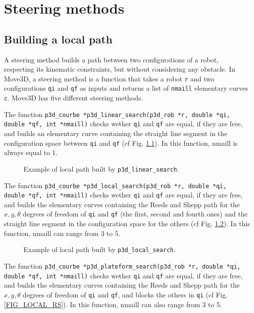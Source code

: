 \chapter{Steering methods}

\section{Building a local path}

A steering method builds a path between two configurations of a robot,
respecting its kinematic constraints, but without considering any
obstacle. In Move3D, a steering method is a function that takes a
robot {\tt r} and two configurations {\tt qi} and {\tt qf} as inputs
and returns a list of {\tt nmaill} elementary curves {\tt c}. Move3D
has five different steering methods. 

The function {\tt p3d\_courbe *p3d\_linear\_search(p3d\_rob *r, double
*qi, double *qf, int *nmaill)}  checks
wether {\tt qi} and {\tt qf} are equal, if they are free, and builds
an elementary curve containing the straight line segment in the
configuration space between {\tt qi} and {\tt qf} (cf
Fig. \ref{FIG_LOCAL_SEG}). In this function, nmaill is always equal to
1.

\begin{figure}[hbt]
\centerline{
}
\caption{\small 
Example of local path built by {\tt p3d\_linear\_search}.
}
\label{FIG_LOCAL_SEG}
\end{figure}  

The function {\tt p3d\_courbe *p3d\_local\_search(p3d\_rob *r, double
*qi, double *qf, int *nmaill)}  checks wether {\tt qi} and {\tt qf} are
equal, if they are free, and builds the elementary curves containing
the Reeds and Shepp path for the $x,y,\theta$ degrees of freedom of
{\tt qi} and {\tt qf} (the first, second and fourth ones) and the
straight line segment in the configuration space for the others (cf
Fig. \ref{FIG_LOCAL_RS_SEG}). In this function, nmaill can range from 3 to 5.

\begin{figure}[hbt]
\centerline{
}
\caption{\small 
Example of local path built by {\tt p3d\_local\_search}.
}
\label{FIG_LOCAL_RS_SEG}
\end{figure}

The function {\tt p3d\_courbe *p3d\_plateform\_search(p3d\_rob *r,
double *qi, double *qf, int *nmaill)} 
checks wether {\tt qi} and {\tt qf} are equal, if they are free, and
builds the elementary curves containing the Reeds and Shepp path for
the $x,y,\theta$ degrees of freedom of {\tt qi} and {\tt qf}, and
blocks the others in {\tt qi} (cf Fig. \ref{FIG_LOCAL_RS}). In this
function, nmaill can also range from 3 to 5.

